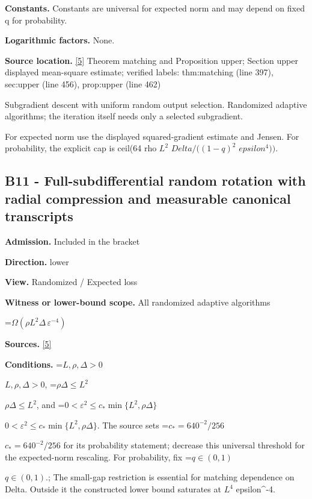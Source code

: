 \documentclass[10pt,a4paper]{article}
\newcommand{\AtlasMath}[1]{\par\begingroup\centering\setbox0=\hbox{$\displaystyle #1$}\ifdim\wd0>1.4\linewidth\typeout{ATLAS WIDE FORMULA: \the\wd0}\fi\ifdim\wd0>\linewidth\resizebox{\linewidth}{!}{\box0}\else\box0\fi\par\endgroup}
\newcommand{\AtlasInlineMath}[1]{\begingroup\setbox0=\hbox{$#1$}\ifdim\wd0>.4\linewidth\endgroup\AtlasMath{#1}\else\endgroup$#1$\fi}
\begin{document}
\textbf{Constants.} Constants are universal for expected norm and may depend on fixed q for probability.



\textbf{Logarithmic factors.} None.



\textbf{Source location.} \href{https://github.com/WU-Wendao/Colombo/blob/main/colombo_sensorium/Complexity_altas/data/sources/colombo/N01/manuscript.pdf}{[5]} Theorem matching and Proposition upper; Section upper displayed mean-square estimate; verified labels: thm:matching (line 397), sec:upper (line 456), prop:upper (line 462)



Subgradient descent with uniform random output selection. Randomized adaptive algorithms; the iteration itself needs only a selected subgradient.



For expected norm use the displayed squared-gradient estimate and Jensen. For probability, the explicit cap is ceil(64 rho $L^2$ $Delta/((1-q)^2$ $epsilon^4))$.



\subsection{B11 - Full-subdifferential random rotation with radial compression and measurable canonical transcripts}


\textbf{Admission.} Included in the bracket



\textbf{Direction.} lower



\textbf{View.} Randomized / Expected loss



\textbf{Witness or lower-bound scope.} All randomized adaptive algorithms



\AtlasMath{\Omega(\rho L^2\Delta\,\varepsilon^{-4})}


\textbf{Sources.} \href{https://github.com/WU-Wendao/Colombo/blob/main/colombo_sensorium/Complexity_altas/data/sources/colombo/N01/manuscript.pdf}{[5]}



\textbf{Conditions.} \AtlasInlineMath{L,\rho,\Delta>0}, \AtlasInlineMath{\rho\Delta\le L^2}, and \AtlasInlineMath{0<\varepsilon^2\le c_*\min\{L^2,\rho\Delta\}}. The source sets \AtlasInlineMath{c_*=640^{-2}/256} for its probability statement; decrease this universal threshold for the expected-norm rescaling. For probability, fix \AtlasInlineMath{q\in(0,1)}.; The small-gap restriction is essential for matching dependence on Delta. Outside it the constructed lower bound saturates at $L^4$ epsilon\textasciicircum{}-4.
\end{document}
